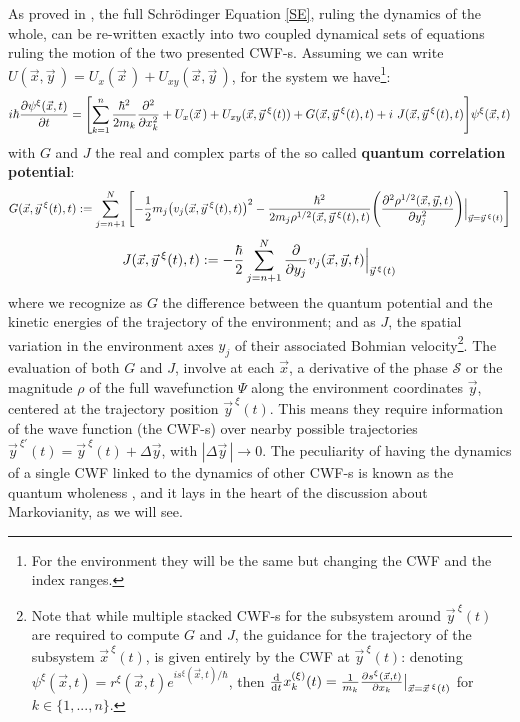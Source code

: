 \documentclass[11pt, a4paper]{article} %
\begin{document}
As proved in \cite{GJ}, the full Schrödinger Equation \eqref{SE}, ruling the dynamics of the whole, can be re-written exactly into two coupled dynamical sets of equations ruling the motion of the two presented CWF-s. Assuming we can write $U(\vec{x},\vec{y}\,)=U_x(\vec{x}\,)+U_{xy}(\vec{x},\vec{y}\,)$, for the system we have\footnote{For the environment they will be the same but changing the CWF and the index ranges.}:\vspace{-0.2cm}
\begin{equation}\label{SE.GJ}
i \hbar \pdv{\psi^\xi (\vec{x},t)}{t} = \qty[\sum_{k=1}^n\frac{\hbar^2}{2m_k} \pdv[2]{}{x_k} + U_x(\vec{x}\,)+ U_{xy}(\vec{x}, \vec{y}^{\: \xi}(t)) + G(\vec{x}, \vec{y}^{\: \xi}(t),t)+i\ J(\vec{x}, \vec{y}^{\: \xi}(t),t)] \psi^\xi (\vec{x},t)
\end{equation}
with $G$ and $J$ the real and complex parts of the so called {\bf quantum correlation potential}:
\begin{equation}\label{G.Bohm}
G(\vec{x},\vec{y}^{\:\xi}(t),t):=\sum_{j=n+1}^N\qty[-\frac{1}{2}m_j\qty(v_j(\vec{x},\vec{y}^{\: \xi}(t),t))^2-\frac{\hbar^2}{2m_j\rho^{1/2}(\vec{x},\vec{y}^{\:\xi}(t),t)}\qty(\pdv[2]{\rho^{1/2}(\vec{x},\vec{y},t)}{y_j})\Big\rvert_{\vec{y}=\vec{y}^{\:\xi}(t)} ]\vspace{-0.2cm}
\end{equation}
\begin{equation}\label{J.Bohm}
J(\vec{x},\vec{y}^{\:\xi}(t),t):=-\frac{\hbar}{2}\sum_{j=n+1}^N\pdv{}{y_j}v_j(\vec{x},\vec{y},t)\Big\rvert_{\vec{y}^{\, \xi}(t)}
\end{equation}
where we recognize as $G$ the difference between the quantum potential \cite{JordiXavier, Durr} and the kinetic energies of the trajectory of the environment; and as $J$, the spatial variation in the environment axes $y_j$ of their associated Bohmian velocity\footnote{Note that while multiple stacked CWF-s for the subsystem around $\vec{y}^{\:\xi}(t)$ are required to compute $G$ and $J$, the guidance for the trajectory of the subsystem $\vec{x}^{\:\xi}(t)$, is given entirely by the CWF at $\vec{y}^{\:\xi}(t)$: denoting $\psi^\xi (\vec{x},t)=r^\xi(\vec{x},t)e^{is^\xi(\vec{x},t)/\hbar}$, then $\dv{}{t}x_k^{(\xi)}(t)=\frac{1}{m_k}\pdv{s^\xi(\vec{x},t)}{x_k}\big\rvert_{\vec{x}=\vec{x}^{\:\xi}(t)}$ for $k\in\{1,...,n\}$.}. The evaluation of both $G$ and $J$, involve at each $\vec{x}$, a derivative of the phase $\mathcal{S}$ or the magnitude $\rho$ of the full wavefunction $\Psi$ along the environment coordinates $\vec{y}$, centered at the trajectory position $\vec{y}^{\:\xi}(t)$. This means they require information of the wave function (the CWF-s) over nearby possible trajectories $\vec{y}^{\:\xi'}(t)=\vec{y}^{\:\xi}(t)+\Delta \vec y$, with $|\Delta\vec y\, |\rightarrow 0$. The peculiarity of having the dynamics of a single CWF linked to the dynamics of other CWF-s is known as the quantum wholeness \cite{JordiXavier}, and it lays in the heart of the discussion about Markovianity, as we will see.
\end{document}
